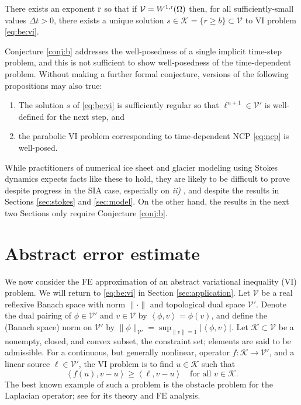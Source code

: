 \documentclass[hidelinks,onefignum,onetabnum,final]{siamart220329}  %
\newcommand{\cK}{\mathcal{K}}
\newcommand{\cV}{\mathcal{V}}
\newcommand{\rr}{{\text{\textnormal{r}}}}
\newcommand{\ip}[2]{\left<#1,#2\right>}
\begin{document}
\begin{conjecture} \label{conj:b}
There exists an exponent $\rr$ so that if $\cV = W^{1,\rr}(\Omega)$ then, for all sufficiently-small values $\Delta t>0$, there exists a unique solution $s \in \cK = \{r\ge b\} \subset \cV$ to VI problem \eqref{eq:be:vi}.
\end{conjecture}

Conjecture \ref{conj:b} addresses the well-posedness of a single implicit time-step problem, and this is not sufficient to show well-posedness of the time-dependent problem.  Without making a further formal conjecture, versions of the following propositions may also true:
\renewcommand{\labelenumi}{\emph{\roman{enumi})}}
\begin{enumerate}
\item The solution $s$ of \eqref{eq:be:vi} is sufficiently regular so that $\ell^{n+1} \in \cV'$ is well-defined for the next step, and
\item the parabolic VI problem \cite{Glowinski1984} corresponding to time-dependent NCP \eqref{eq:ncp} is well-posed.
\end{enumerate}
While practitioners of numerical ice sheet and glacier modeling using Stokes dynamics expects facts like these to hold, they are likely to be difficult to prove despite progress in the SIA case, especially on \emph{ii)} \cite{Calvoetal2003,PiersantiTemam2023}, and despite the results in Sections \ref{sec:stokes} and \ref{sec:model}.  On the other hand, the results in the next two Sections only require Conjecture \ref{conj:b}.


\section{Abstract error estimate} \label{sec:abstractestimate}

We now consider the FE approximation of an abstract variational inequality (VI) problem.  We will return to \eqref{eq:be:vi} in Section \ref{sec:application}.  Let $\cV$ be a real reflexive Banach space with norm $\|\cdot\|$ and topological dual space $\cV'$.  Denote the dual pairing of $\phi \in \cV'$ and $v\in\cV$ by $\ip{\phi}{v} = \phi(v)$, and define the (Banach space) norm on $\cV'$ by $\|\phi\|_{\cV'} = \sup_{\|v\|=1} |\!\ip{\phi}{v}\!|$.  Let $\cK \subset \cV$ be a nonempty, closed, and convex subset, the constraint set; elements are said to be admissible.  For a continuous, but generally nonlinear, operator $f:\cK \to \cV'$, and a linear source $\ell\in \cV'$, the VI problem is to find $u\in \cK$ such that
\begin{equation}
\ip{f(u)}{v-u} \ge \ip{\ell}{v-u} \quad \text{for all } v\in \cK. \label{eq:vi}
\end{equation}
The best known example of such a problem is the obstacle problem for the Laplacian operator; see \cite{Ciarlet2002,Evans2010,KinderlehrerStampacchia1980} for its theory and FE analysis.
\end{document}
